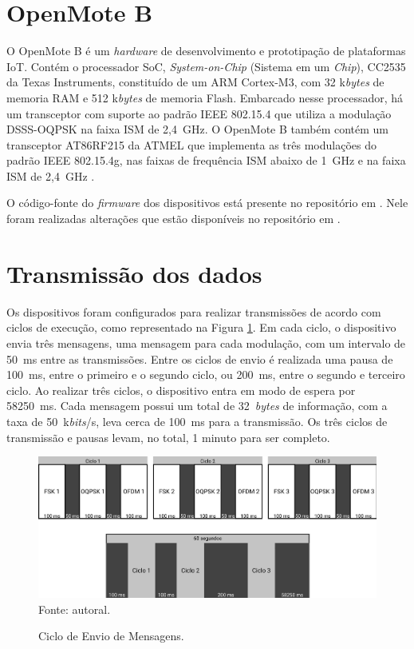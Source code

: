 \section{OpenMote B}
O OpenMote B é um \emph{hardware} de desenvolvimento e prototipação de plataformas IoT. Contém o processador SoC, \emph{System-on-Chip} (Sistema em um \emph{Chip}), CC2535 da Texas Instruments, constituído de um ARM Cortex-M3, com 32 k\emph{bytes} de memoria RAM e 512 k\emph{bytes} de memoria Flash. Embarcado nesse processador, há um transceptor com suporte ao padrão IEEE 802.15.4 que utiliza a modulação DSSS-OQPSK na faixa ISM de 2,4~GHz. O OpenMote B também contém um transceptor AT86RF215 da ATMEL que implementa as três modulações do padrão IEEE 802.15.4g, nas faixas de frequência ISM abaixo de 1~GHz e na faixa ISM de 2,4~GHz \cite{openmoteb-userguide}.

O código-fonte do \emph{firmware} dos dispositivos está presente no repositório em \cite{openmoteb-firmware}. Nele foram realizadas alterações que estão disponíveis no repositório em \cite{openmoteb-gcompi}.

\section{Transmissão dos dados}
Os dispositivos foram configurados para realizar transmissões de acordo com ciclos de execução, como representado na Figura \ref{fig:ciclo_envio}. Em cada ciclo, o dispositivo envia três mensagens, uma mensagem para cada modulação, com um intervalo de 50~ms entre as transmissões. Entre os ciclos de envio é realizada uma pausa de 100~ms, entre o primeiro e o segundo ciclo, ou 200~ms, entre o segundo e terceiro ciclo. Ao realizar três ciclos, o dispositivo entra em modo de espera por 58250~ms. Cada mensagem possui um total de 32~\emph{bytes} de informação, com a taxa de 50~k\emph{bits}/s, leva cerca de 100~ms para a transmissão. Os três ciclos de transmissão e pausas levam, no total, 1 minuto para ser completo.

\begin{figure}[h]
  \centering
  \caption{Ciclo de Envio de Mensagens.}
  \includegraphics[width=\textwidth]{./sections/textual/chapters/images/metodo_ciclo_envio.png}\\
  Fonte: autoral.
  \label{fig:ciclo_envio}
\end{figure}

